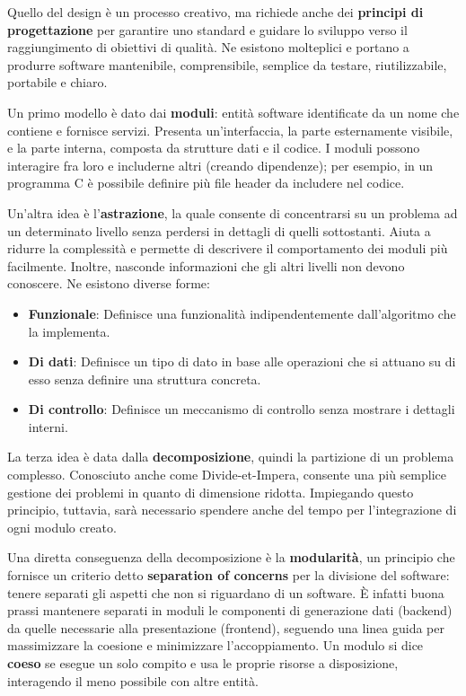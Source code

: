 \noindent Quello del design è un processo creativo, ma richiede anche dei \textbf{principi di progettazione} per garantire uno standard e guidare lo sviluppo verso il raggiungimento di obiettivi di qualità. Ne esistono molteplici e portano a produrre software mantenibile, comprensibile, semplice da testare, riutilizzabile, portabile e chiaro.\par
Un primo modello è dato dai \textbf{moduli}: entità software identificate da un nome che contiene e fornisce servizi. Presenta un'interfaccia, la parte esternamente visibile, e la parte interna, composta da strutture dati e il codice. I moduli possono interagire fra loro e includerne altri (creando dipendenze); per esempio, in un programma C è possibile definire più file header da includere nel codice.\par
Un'altra idea è l'\textbf{astrazione}, la quale consente di concentrarsi su un problema ad un determinato livello senza perdersi in dettagli di quelli sottostanti. Aiuta a ridurre la complessità e permette di descrivere il comportamento dei moduli più facilmente. Inoltre, nasconde informazioni che gli altri livelli non devono conoscere. Ne esistono diverse forme: \begin{itemize}
	\item \textbf{Funzionale}: Definisce una funzionalità indipendentemente dall'algoritmo che la implementa.
	\item \textbf{Di dati}: Definisce un tipo di dato in base alle operazioni che si attuano su di esso senza definire una struttura concreta.
	\item \textbf{Di controllo}: Definisce un meccanismo di controllo senza mostrare i dettagli interni.
\end{itemize}
\noindent La terza idea è data dalla \textbf{decomposizione}, quindi la partizione di un problema complesso. Conosciuto anche come Divide-et-Impera, consente una più semplice gestione dei problemi in quanto di dimensione ridotta. Impiegando questo principio, tuttavia, sarà necessario spendere anche del tempo per l'integrazione di ogni modulo creato.\par
Una diretta conseguenza della decomposizione è la \textbf{modularità}, un principio che fornisce un criterio detto \textbf{separation of concerns} per la divisione del software: tenere separati gli aspetti che non si riguardano di un software. È infatti buona prassi mantenere separati in moduli le componenti di generazione dati (backend) da quelle necessarie alla presentazione (frontend), seguendo una linea guida per massimizzare la coesione e minimizzare l'accoppiamento. Un modulo si dice \textbf{coeso} se esegue un solo compito e usa le proprie risorse a disposizione, interagendo il meno possibile con altre entità.\par
